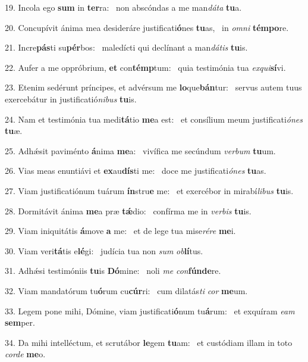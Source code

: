 19. Incola ego \textbf{sum} in \textbf{ter}ra: \ast\  non abscóndas a me man\textit{dá}\textit{ta} \textbf{tu}a.\

20. Concupívit ánima mea desideráre justificati\textbf{ó}nes \textbf{tu}as, \ast\  in \textit{om}\textit{ni} \textbf{tém}\textbf{po}re.\

21. Incre\textbf{pás}ti su\textbf{pér}bos: \ast\  maledícti qui declínant a man\textit{dá}\textit{tis} \textbf{tu}is.\

22. Aufer a me oppróbrium, \textbf{et} con\textbf{témp}tum: \ast\  quia testimónia tua \textit{ex}\textit{qui}\textbf{sí}vi.\

23. Etenim sedérunt príncipes, et advérsum me \textbf{lo}que\textbf{bán}tur: \ast\  servus autem tuus exercebátur in justificatió\textit{ni}\textit{bus} \textbf{tu}is.\

24. Nam et testimónia tua medi\textbf{tá}tio \textbf{me}a est: \ast\  et consílium meum justificati\textit{ó}\textit{nes} \textbf{tu}æ.\

25. Adhǽsit paviménto \textbf{á}nima \textbf{me}a: \ast\  vivífica me secúndum \textit{ver}\textit{bum} \textbf{tu}um.\

26. Vias meas enuntiávi et \textbf{ex}au\textbf{dís}ti me: \ast\  doce me justificati\textit{ó}\textit{nes} \textbf{tu}as.\

27. Viam justificatiónum tuárum \textbf{ín}stru\textbf{e} me: \ast\  et exercébor in mirabí\textit{li}\textit{bus} \textbf{tu}is.\

28. Dormitávit ánima \textbf{me}a præ \textbf{tǽ}dio: \ast\  confírma me in \textit{ver}\textit{bis} \textbf{tu}is.\

29. Viam iniquitátis \textbf{á}move \textbf{a} me: \ast\  et de lege tua mise\textit{ré}\textit{re} \textbf{me}i.\

30. Viam veri\textbf{tá}tis e\textbf{lé}gi: \ast\  judícia tua non \textit{sum} \textit{ob}\textbf{lí}tus.\

31. Adhǽsi testimóniis \textbf{tu}is \textbf{Dó}mine: \ast\  noli \textit{me} \textit{con}\textbf{fún}\textbf{de}re.\

32. Viam mandatórum tu\textbf{ó}rum cu\textbf{cúr}ri: \ast\  cum dilatás\textit{ti} \textit{cor} \textbf{me}um.\

33. Legem pone mihi, Dómine, viam justificati\textbf{ó}num tu\textbf{á}rum: \ast\  et exquíram \textit{e}\textit{am} \textbf{sem}per.\

34. Da mihi intelléctum, et scrutábor \textbf{le}gem \textbf{tu}am: \ast\  et custódiam illam in toto \textit{cor}\textit{de} \textbf{me}o.\

